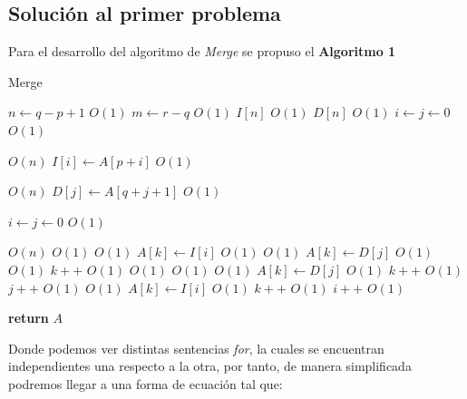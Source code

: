 \documentclass[12pt,twoside]{article}
\begin{document}
\subsection{\textbf{Soluci\'on al primer problema}}

Para el desarrollo del algoritmo de \textit{Merge} se propuso el \textbf{Algoritmo 1}

\begin{algorithm}
  \caption{Merge}\label{euclid}
  \begin{algorithmic}[1]
      \State $n\gets q - p + 1$ \Comment $O(1)$
      \State $m\gets r - q$ \Comment $O(1)$
      \State $I[n]$ \Comment $O(1)$
      \State $D[n]$ \Comment $O(1)$
      \State $i\gets j \gets 0$ \Comment $O(1)$
      
       \Comment $O(n)$
        \State $I[i]\gets A[p+i]$ \Comment $O(1)$
      \EndFor

       \Comment $O(n)$
        \State $D[j]\gets A[q+j+1]$ \Comment $O(1)$
      \EndFor

      \State $i\gets j \gets 0$ \Comment $O(1)$

       \Comment $O(n)$
         \Comment $O(1)$
           \Comment $O(1)$
            \State $A[k] \gets I[i]$ \Comment $O(1)$
          \Else \Comment $O(1)$
            \State $A[k] \gets D[j]$ \Comment $O(1)$
          \EndIf \Comment $O(1)$
          \State $k++$ \Comment $O(1)$
        \Else  \Comment $O(1)$
           \Comment $O(1)$
             \Comment $O(1)$
              \State $A[k] \gets D[j]$ \Comment $O(1)$
              \State $k++$ \Comment $O(1)$
              \State $j++$ \Comment $O(1)$
            \EndWhile
            \Else
               \Comment $O(1)$
                \State $A[k] \gets I[i]$ \Comment $O(1)$
                \State $k++$ \Comment $O(1)$
                \State $i++$ \Comment $O(1)$
              \EndWhile
          \EndIf
        \EndIf
      \EndFor

      \State \textbf{return} $A$
  \EndFunction
  \end{algorithmic}
\end{algorithm}

Donde podemos ver distintas sentencias \textit{for}, la cuales se encuentran independientes una respecto a la otra, por tanto, de 
manera simplificada podremos llegar a una forma de ecuación tal que:
\end{document}
